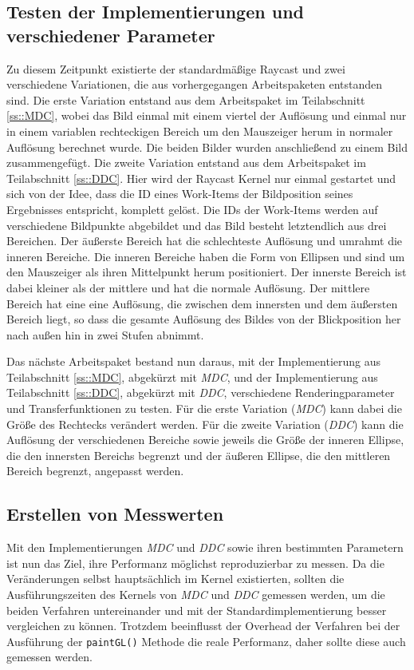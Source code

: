 \subsection{Testen der Implementierungen und verschiedener Parameter}
Zu diesem Zeitpunkt existierte der standardmäßige Raycast und zwei verschiedene Variationen, die aus vorhergegangen Arbeitspaketen entstanden sind.
Die erste Variation entstand aus dem Arbeitspaket im Teilabschnitt \ref{ss::MDC}, wobei das Bild einmal mit einem viertel der Auflösung und einmal nur in einem variablen rechteckigen Bereich um den Mauszeiger herum in normaler Auflösung berechnet wurde.
Die beiden Bilder wurden anschließend zu einem Bild zusammengefügt.
Die zweite Variation entstand aus dem Arbeitspaket im Teilabschnitt \ref{ss::DDC}.
Hier wird der Raycast Kernel nur einmal gestartet und sich von der Idee, dass die ID eines Work-Items der Bildposition seines Ergebnisses entspricht, komplett gelöst.
Die IDs der Work-Items werden auf verschiedene Bildpunkte abgebildet und das Bild besteht letztendlich aus drei Bereichen.
Der äußerste Bereich hat die schlechteste Auflösung und umrahmt die inneren Bereiche.
Die inneren Bereiche haben die Form von Ellipsen und sind um den Mauszeiger als ihren Mittelpunkt herum positioniert.
Der innerste Bereich ist dabei kleiner als der mittlere und hat die normale Auflösung.
Der mittlere Bereich hat eine eine Auflösung, die zwischen dem innersten und dem äußersten Bereich liegt, so dass die gesamte Auflösung des Bildes von der Blickposition her nach außen hin in zwei Stufen abnimmt.

Das nächste Arbeitspaket bestand nun daraus, mit der Implementierung aus Teilabschnitt \ref{ss::MDC}, abgekürzt mit \emph{MDC}, und der Implementierung aus Teilabschnitt \ref{ss::DDC}, abgekürzt mit \emph{DDC}, verschiedene Renderingparameter und Transferfunktionen zu testen.
Für die erste Variation (\emph{MDC}) kann dabei die Größe des Rechtecks verändert werden.
Für die zweite Variation (\emph{DDC}) kann die Auflösung der verschiedenen Bereiche sowie jeweils die Größe der inneren Ellipse, die den innersten Bereichs begrenzt und der äußeren Ellipse, die den mittleren Bereich begrenzt, angepasst werden.


\subsection{Erstellen von Messwerten}
Mit den Implementierungen \emph{MDC} und \emph{DDC} sowie ihren bestimmten Parametern ist nun das Ziel, ihre Performanz möglichst reproduzierbar zu messen. Da die Veränderungen selbst hauptsächlich im Kernel existierten, sollten die Ausführungszeiten des Kernels von \emph{MDC} und \emph{DDC} gemessen werden, um die beiden Verfahren untereinander und mit der Standardimplementierung besser vergleichen zu können.
Trotzdem beeinflusst der Overhead der Verfahren bei der Ausführung der \texttt{paintGL()} Methode die reale Performanz, daher sollte diese auch gemessen werden.


